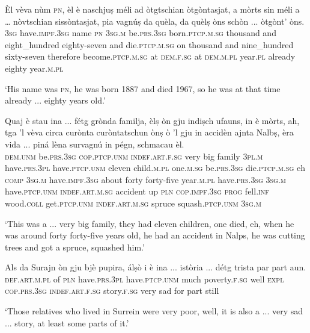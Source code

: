 \begin{linenumbers}
\gll  Èl vèva nùm \textsc{pn}, èl è naschjuṣ méli ad òtgtschian òtgòntasjat, a mòrts sin méli a … nòvtschian sissòntasjat, pia vagnúṣ da quèla, da quèlṣ òns schòn ... òtgònt’ òns.  \\
     \textsc{3sg} have.\textsc{impf.3sg} name \textsc{pn}  \textsc{3sg.m} be.\textsc{prs.3sg} born.\textsc{ptcp.m.sg} thousand and eight\_hundred eighty-seven and die.\textsc{ptcp.m.sg} on thousand and {} nine\_hundred sixty-seven therefore become.\textsc{ptcp.m.sg} at \textsc{dem.f.sg} at \textsc{dem.m.pl} year.\textsc{pl} already {} eighty year.\textsc{m.pl} \\
\end{linenumbers}
\medskip
\glt `His name was \textsc{pn}, he was born 1887 and died 1967, so he was at that time already ... eighty years old.'
\medskip

\begin{linenumbers}
\gll Quaj è stau ina ... fétg grònda familja, èlṣ òn gju indiṣch ufauns, in è mòrts, ah, tga ’l vèva circa curònta curòntatschun ònṣ ò 'l gju in accidèn ajnta Nalbṣ, èra vida ... piná lèna survagnú in pégn, schmacau èl.   \\
  \textsc{dem.unm}  be.\textsc{prs.3sg}  \textsc{cop.ptcp.unm}  \textsc{indef.art.f.sg} {} very big family \textsc{3pl.m} have.\textsc{prs.3pl} have.\textsc{ptcp.unm} eleven child.\textsc{m.pl} one.\textsc{m.sg} be.\textsc{prs.3sg} die.\textsc{ptcp.m.sg} eh \textsc{comp} \textsc{3sg.m} have.\textsc{impf.3sg} about forty forty-five year.\textsc{m.pl} have.\textsc{prs.3sg} \textsc{3sg.m} have.\textsc{ptcp.unm} \textsc{indef.art.m.sg} accident up \textsc{pln} \textsc{cop.impf.3sg} \textsc{prog} {} fell.\textsc{inf} wood.\textsc{coll} get.\textsc{ptcp.unm} \textsc{indef.art.m.sg} spruce squash.\textsc{ptcp.unm} \textsc{3sg.m} \\
\end{linenumbers}
\medskip
\glt `This was a ... very big family, they had eleven children, one died, eh, when he was around forty forty-five years old, he had an accident in Nalps, he was cutting trees and got a spruce, squashed him.'
\medskip

\begin{linenumbers}
\gll Als da Surajn òn gju bjè pupira, álṣò i è ina ... istòria ... détg trista par part aun.\\
    \textsc{def.art.m.pl} of \textsc{pln} have.\textsc{prs.3pl} have.\textsc{ptcp.unm} much poverty.\textsc{f.sg} well \textsc{expl} \textsc{cop.prs.3sg} \textsc{indef.art.f.sg} {} story.\textsc{f.sg} {} very sad for part still \\
\end{linenumbers}
\medskip
\glt `Those relatives who lived in Surrein were very poor, well, it is also a ... very sad ... story, at least some parts of it.'
\medskip

